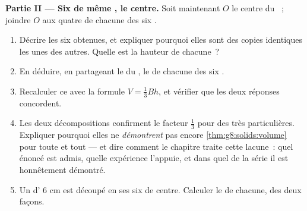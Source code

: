 \begin{problem}
\medskip
\noindent\textbf{Partie II --- Six  de même , le
centre.}
Soit maintenant $O$ le centre du ~; joindre $O$ aux quatre
 de chacune des six .
\begin{enumerate}[resume]
  \item Décrire les six  obtenues, et expliquer pourquoi
        elles sont des copies identiques les unes des autres. Quelle
        est la hauteur de chacune~?
  \item En déduire, en partageant le  du , le  de
        chacune des six .
  \item Recalculer ce  avec la formule $V = \frac13 B h$, et
        vérifier que les deux réponses concordent.
  \item Les deux décompositions confirment le facteur $\frac13$ pour
        des  très particulières. Expliquer pourquoi elles
        ne \emph{démontrent} pas encore
        \cref{thm:g8:solids:volume} pour toute  et tout
         --- et dire comment le chapitre traite cette lacune~:
        quel énoncé est admis, quelle expérience l'appuie, et dans
        quel  de la série il est honnêtement démontré.
  \item Un  d' $6$ cm est découpé en ses six  de
        centre. Calculer le  de chacune, des deux façons.
\end{enumerate}


\end{problem}

